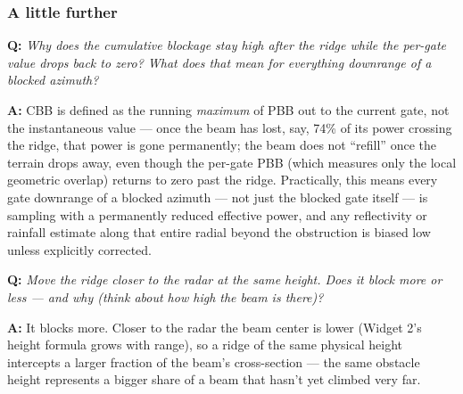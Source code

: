 \documentclass[11pt]{article}
\newenvironment{qa}[1]{\par\noindent\textbf{\color{qgray}Q: }\emph{#1}\par\noindent\textbf{A: }}{\par\vspace{6pt}}
\newcommand{\tier}[1]{\subsubsection*{#1}}
\begin{document}
\tier{A little further}
\begin{qa}{Why does the cumulative blockage stay high \emph{after} the ridge while the per-gate value drops back to zero? What does that mean for everything downrange of a blocked azimuth?}
CBB is defined as the running \emph{maximum} of PBB out to the current gate, not the instantaneous value --- once the beam has lost, say, 74\% of its power crossing the ridge, that power is gone permanently; the beam does not ``refill'' once the terrain drops away, even though the per-gate PBB (which measures only the local geometric overlap) returns to zero past the ridge. Practically, this means every gate downrange of a blocked azimuth --- not just the blocked gate itself --- is sampling with a permanently reduced effective power, and any reflectivity or rainfall estimate along that entire radial beyond the obstruction is biased low unless explicitly corrected.
\end{qa}
\begin{qa}{Move the ridge closer to the radar at the same height. Does it block more or less --- and why (think about how high the beam is there)?}
It blocks more. Closer to the radar the beam center is lower (Widget 2's height formula grows with range), so a ridge of the same physical height intercepts a larger fraction of the beam's cross-section --- the same obstacle height represents a bigger share of a beam that hasn't yet climbed very far.
\end{qa}
\end{document}
